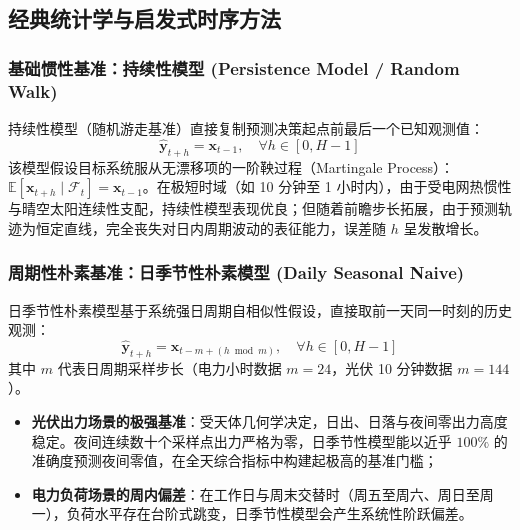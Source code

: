 \subsection{经典统计学与启发式时序方法}
\label{subsec:classical_zh}

\subsubsection{基础惯性基准：持续性模型 (Persistence Model / Random Walk)}
持续性模型（随机游走基准）直接复制预测决策起点前最后一个已知观测值：
\begin{equation}
    \hat{\mathbf{y}}_{t+h} = \mathbf{x}_{t-1}, \quad \forall h \in [0, H-1]
\end{equation}
该模型假设目标系统服从无漂移项的一阶鞅过程（Martingale Process）：$\mathbb{E}[\mathbf{x}_{t+h} \mid \mathcal{F}_t] = \mathbf{x}_{t-1}$。在极短时域（如 10 分钟至 1 小时内），由于受电网热惯性与晴空太阳连续性支配，持续性模型表现优良；但随着前瞻步长拓展，由于预测轨迹为恒定直线，完全丧失对日内周期波动的表征能力，误差随 $h$ 呈发散增长。

\subsubsection{周期性朴素基准：日季节性朴素模型 (Daily Seasonal Naive)}
日季节性朴素模型基于系统强日周期自相似性假设，直接取前一天同一时刻的历史观测：
\begin{equation}
    \hat{\mathbf{y}}_{t+h} = \mathbf{x}_{t - m + (h \bmod m)}, \quad \forall h \in [0, H-1]
\end{equation}
其中 $m$ 代表日周期采样步长（电力小时数据 $m=24$，光伏 10 分钟数据 $m=144$）。
\begin{itemize}
    \item \textbf{光伏出力场景的极强基准}：受天体几何学决定，日出、日落与夜间零出力高度稳定。夜间连续数十个采样点出力严格为零，日季节性模型能以近乎 $100\%$ 的准确度预测夜间零值，在全天综合指标中构建起极高的基准门槛；
    \item \textbf{电力负荷场景的周内偏差}：在工作日与周末交替时（周五至周六、周日至周一），负荷水平存在台阶式跳变，日季节性模型会产生系统性阶跃偏差。
\end{itemize}

